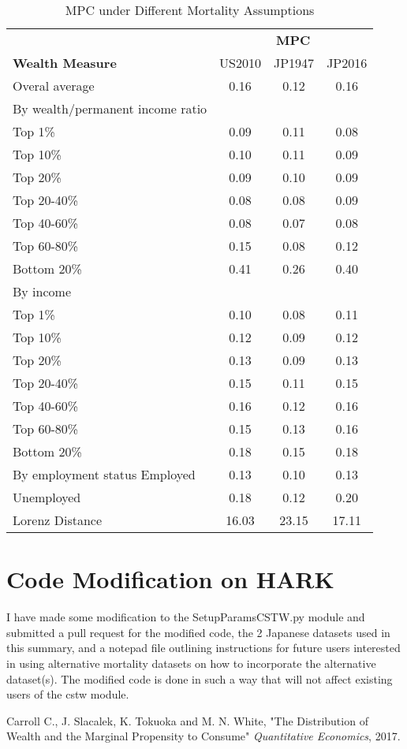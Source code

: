 \documentclass[11pt]{article}
\begin{document}
\begin{table} 
\centering 
\caption{MPC under Different Mortality Assumptions} 
\begin{tabular}{l c c c} 
\toprule 
& \multicolumn{3}{c}{\textbf{MPC}} \\ 
\cmidrule(l){2-4} 
\textbf{Wealth Measure} & US2010 & JP1947 & JP2016 \\ 
\midrule 
Overal average & 0.16  & 0.12 & 0.16  \\ 
\midrule 
By wealth/permanent income ratio \\ 
 Top 1\% & 0.09 & 0.11 & 0.08 \\ 
 Top 10\% & 0.10 & 0.11 & 0.09 \\ 
 Top 20\% & 0.09 & 0.10 & 0.09 \\ 
 Top 20-40\% & 0.08 & 0.08 & 0.09 \\ 
 Top 40-60\% & 0.08 & 0.07 & 0.08 \\ 
 Top 60-80\% & 0.15 & 0.08 & 0.12 \\ 
 Bottom 20\% & 0.41 & 0.26 & 0.40 \\ 
\midrule 
By income \\ 
 Top 1\% & 0.10 & 0.08 & 0.11 \\ 
 Top 10\% & 0.12 & 0.09 & 0.12 \\ 
 Top 20\% & 0.13 & 0.09 & 0.13 \\ 
 Top 20-40\% & 0.15 & 0.11 & 0.15 \\ 
 Top 40-60\% & 0.16 & 0.12 & 0.16 \\ 
 Top 60-80\% & 0.15 & 0.13 & 0.16 \\ 
 Bottom 20\% & 0.18 & 0.15 & 0.18 \\ 
\midrule 
By employment status
 Employed & 0.13 & 0.10 & 0.13  \\ 
 Unemployed & 0.18 & 0.12 & 0.20 \\ 
\midrule 
 Lorenz Distance & 16.03 & 23.15 & 17.11  \\ 
\bottomrule 
\end{tabular}

\label{tab:template} 
\end{table}

\section{Code Modification on HARK}

I have made some modification to the SetupParamsCSTW.py module and submitted a pull request for the modified code, the 2 Japanese datasets used in this summary, and a notepad file outlining instructions for future users interested in using alternative mortality datasets on how to incorporate the alternative dataset(s). The modified code is done in such a way that will not affect existing users of the cstw module.

\begin{thebibliography}{9}
Carroll C., J. Slacalek, K. Tokuoka and M. N. White, "The Distribution of Wealth and the Marginal Propensity to Consume"
\textit{Quantitative Economics}, 2017.
\end{thebibliography}
\end{document}
